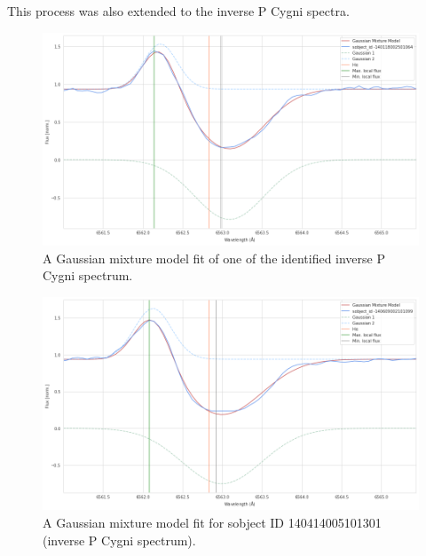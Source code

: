 This process was also extended to the inverse P Cygni spectra.

\begin{figure}[!htb]
\centering
\includegraphics[scale=0.45]{figures/inverse p cygni 1.png}
\caption{A Gaussian mixture model fit of one of the identified inverse P Cygni spectrum. }
\end{figure}

\begin{figure}[!htb]
\centering
\includegraphics[scale=0.45]{figures/inverse p cygni fitted 2.png}
\caption{A Gaussian mixture model fit for sobject ID 140414005101301 (inverse P Cygni spectrum). }
\end{figure}










